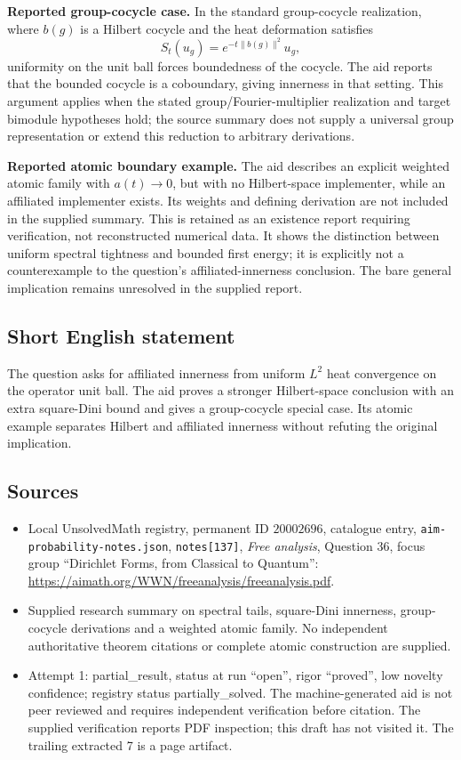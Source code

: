 \documentclass[11pt]{article}
\begin{document}
\textbf{Reported group-cocycle case.} In the standard group-cocycle realization, where \(b(g)\) is a Hilbert cocycle and the heat deformation satisfies
\[
 S_t(u_g)=e^{-t\|b(g)\|^2}u_g,
\]
uniformity on the unit ball forces boundedness of the cocycle. The aid reports that the bounded cocycle is a coboundary, giving innerness in that setting. This argument applies when the stated group/Fourier-multiplier realization and target bimodule hypotheses hold; the source summary does not supply a universal group representation or extend this reduction to arbitrary derivations.

\textbf{Reported atomic boundary example.} The aid describes an explicit weighted atomic family with \(a(t)\to0\), but with no Hilbert-space implementer, while an affiliated implementer exists. Its weights and defining derivation are not included in the supplied summary. This is retained as an existence report requiring verification, not reconstructed numerical data. It shows the distinction between uniform spectral tightness and bounded first energy; it is explicitly not a counterexample to the question's affiliated-innerness conclusion. The bare general implication remains unresolved in the supplied report.
\subsection{Short English statement}
The question asks for affiliated innerness from uniform \(L^2\) heat convergence on the operator unit ball. The aid proves a stronger Hilbert-space conclusion with an extra square-Dini bound and gives a group-cocycle special case. Its atomic example separates Hilbert and affiliated innerness without refuting the original implication.
\subsection{Sources}
\begin{itemize}
\item Local UnsolvedMath registry, permanent ID \(20002696\), catalogue entry, \texttt{aim-probability-notes.json}, \texttt{notes[137]}, \emph{Free analysis}, Question 36, focus group ``Dirichlet Forms, from Classical to Quantum'': \url{https://aimath.org/WWN/freeanalysis/freeanalysis.pdf}.
\item Supplied research summary on spectral tails, square-Dini innerness, group-cocycle derivations and a weighted atomic family. No independent authoritative theorem citations or complete atomic construction are supplied.
\item Attempt 1: partial\_result, status at run ``open'', rigor ``proved'', low novelty confidence; registry status partially\_solved. The machine-generated aid is not peer reviewed and requires independent verification before citation. The supplied verification reports PDF inspection; this draft has not visited it. The trailing extracted 7 is a page artifact.
\end{itemize}
\end{document}
